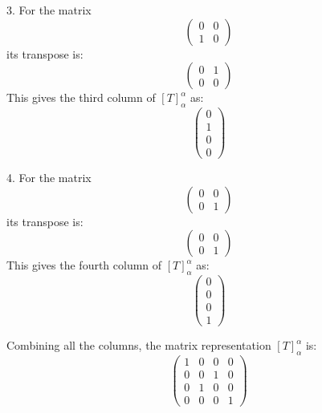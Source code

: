 \documentclass{article}
\begin{document}
	3. For the matrix 
	\[
	\begin{pmatrix}
		0 & 0 \\
		1 & 0
	\end{pmatrix}
	\]
	its transpose is:
	\[
	\begin{pmatrix}
		0 & 1 \\
		0 & 0
	\end{pmatrix}
	\]
	This gives the third column of \([T]_{\alpha}^{\alpha}\) as:
	\[ \begin{pmatrix}
		0 \\
		1 \\
		0 \\
		0
	\end{pmatrix} \]
	
	4. For the matrix 
	\[
	\begin{pmatrix}
		0 & 0 \\
		0 & 1
	\end{pmatrix}
	\]
	its transpose is:
	\[
	\begin{pmatrix}
		0 & 0 \\
		0 & 1
	\end{pmatrix}
	\]
	This gives the fourth column of \([T]_{\alpha}^{\alpha}\) as:
	\[ \begin{pmatrix}
		0 \\
		0 \\
		0 \\
		1
	\end{pmatrix} \]
	
	Combining all the columns, the matrix representation \([T]_{\alpha}^{\alpha}\) is:
	\[ 
	\begin{pmatrix}
		1 & 0 & 0 & 0 \\
		0 & 0 & 1 & 0 \\
		0 & 1 & 0 & 0 \\
		0 & 0 & 0 & 1
	\end{pmatrix}
	\]
	
\end{document}
